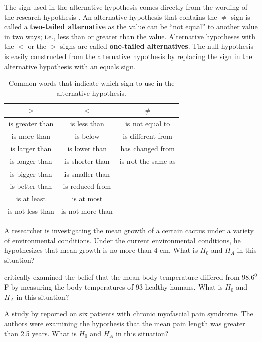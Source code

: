 \documentclass[10pt,openany]{book}\usepackage[]{graphicx}\usepackage[]{color}
\begin{document}

The sign used in the alternative hypothesis comes directly from the wording of the research hypothesis .  An alternative hypothesis that contains the $\neq$ sign is called a \textbf{two-tailed alternative} as the value can be ``not equal'' to another value in two ways; i.e., less than or greater than the value.  Alternative hypotheses with the $<$ or the $>$ signs are called \textbf{one-tailed alternatives}.  The null hypothesis is easily constructed from the alternative hypothesis by replacing the sign in the alternative hypothesis with an equals sign.

\begin{table}[htbp]
  \caption{Common words that indicate which sign to use in the alternative hypothesis.}
  \label{tab:HAwords}
  \centering
  \begin{tabular}{ccc}
\hline\hline
$>$ & $<$ & $\neq$ \\
\hline
is greater than & is less than & is not equal to \\
is more than & is below & is different from \\
is larger than & is lower than & has changed from \\
is longer than & is shorter than & is not the same as \\
is bigger than & is smaller than &  \\
is better than & is reduced from &  \\
is at least & is at most &  \\
is not less than & is not more than &  \\
\hline\hline
  \end{tabular}
\end{table}


\begin{exsection}
  \item \label{revex:HypTCactus} A researcher is investigating the mean growth of a certain cactus under a variety of environmental conditions. Under the current environmental conditions, he hypothesizes that mean growth is no more than 4 cm. What is $H_{0}$ and $H_{A}$ in this situation? 
  \item \label{revex:HypTBodyTemp} \cite{Machowiaketal1992} critically examined the belief that the mean body temperature differed from 98.6$^{0}$F by measuring the body temperatures of 93 healthy humans.  What is $H_{0}$ and $H_{A}$ in this situation? 
  \item \label{revex:HypTPain} A study by \cite{Cheshireetal1994} reported on six patients with chronic myofascial pain syndrome. The authors were examining the hypothesis that the mean pain length was greater than 2.5 years.  What is $H_{0}$ and $H_{A}$ in this situation? 
\end{exsection}
\end{document}
